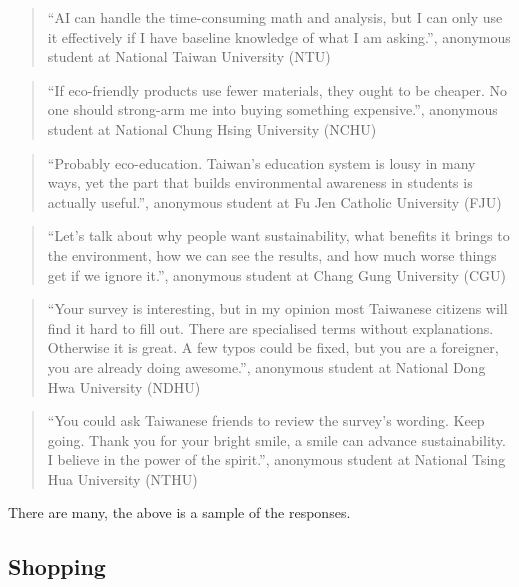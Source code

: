 \documentclass[
  12pt,
  letterpaper,
  DIV=11,
  numbers=noendperiod]{scrartcl}
\begin{document}
\begin{quote}
``AI can handle the time-consuming math and analysis, but I can only use
it effectively if I have baseline knowledge of what I am asking.'',
anonymous student at National Taiwan University (NTU)
\end{quote}

\begin{quote}
``If eco-friendly products use fewer materials, they ought to be
cheaper. No one should strong-arm me into buying something expensive.'',
anonymous student at National Chung Hsing University (NCHU)
\end{quote}

\begin{quote}
``Probably eco-education. Taiwan's education system is lousy in many
ways, yet the part that builds environmental awareness in students is
actually useful.'', anonymous student at Fu Jen Catholic University
(FJU)
\end{quote}

\begin{quote}
``Let's talk about why people want sustainability, what benefits it
brings to the environment, how we can see the results, and how much
worse things get if we ignore it.'', anonymous student at Chang Gung
University (CGU)
\end{quote}

\begin{quote}
``Your survey is interesting, but in my opinion most Taiwanese citizens
will find it hard to fill out. There are specialised terms without
explanations. Otherwise it is great. A few typos could be fixed, but you
are a foreigner, you are already doing awesome.'', anonymous student at
National Dong Hwa University (NDHU)
\end{quote}

\begin{quote}
``You could ask Taiwanese friends to review the survey's wording. Keep
going. Thank you for your bright smile, a smile can advance
sustainability. I believe in the power of the spirit.'', anonymous
student at National Tsing Hua University (NTHU)
\end{quote}

There are many, the above is a sample of the responses.

\newpage

\subsection{Shopping}\label{shopping}
\end{document}
